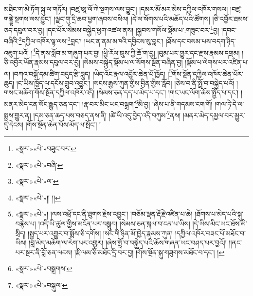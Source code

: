 མཐིང་ག་མེ་ཏོག་སྐུ་ལ་གཏོར། །བཛྲ་ཨཱ་ལོ་ཀེ་སྔགས་ལས་བྱུང་། །དམར་མོ་མར་མེས་དཀྱིལ་འཁོར་གསལ། །བཛྲ་གནྡྷེ་སྔགས་ལས་བྱུང་། །ལྗང་གུ་དྲི་ཆབ་ཕྱག་ཞབས་བསིལ། །དེ་ལ་སོགས་པའི་མཆོད་པའི་ཚོགས། །ཅི་འབྱོར་ཐམས་ཅད་དབུལ་བར་བྱ། །དང་པོར་སེམས་བསྐྱེད་ཕྱག་འཚལ་ནས། །སྐྱབས་གསོལ་སྡོམ་པ་:གཟུང་བར་\footnote{«སྣར་»«པེ་»བཟུང་བར་}བྱ། །དབང་བཞིའི་\footnote{«སྣར་»«པེ་»བཞི་}དཀྱིལ་འཁོར་ལྷ་ལས་\footnote{«སྣར་»«པེ་»ལ་}བླང་། །ཡང་ན་ནམ་མཁའི་དབྱིངས་སུ་བླང་། །ཐོས་དང་བསམ་པས་བདག་ཉིད་འཇུག་པའོ། །\footnote{«སྣར་»«པེ་»།། །།}དེ་ནས་སློབ་མ་གཞུག་པར་བྱ། །ཕྱི་རོལ་ཁྲུས་ཀྱི་ཆོ་ག་བྱ། །བུམ་པར་གྱུར་དང་རྫས་རྣམས་དགྲམ། །ཅི་འབྱོར་ཡོན་རྣམས་དབུལ་བར་བྱ། །སེམས་བསྐྱེད་སྡོམ་པ་ལ་སོགས་སྔོན་བཞིན་བྱ། །སྡོམ་པ་ལེགས་པར་འཛིན་པ་ལ། །བཀའ་བསྒོ་དམ་ཚིག་བདུད་རྩི་བླུད། །ཡིད་འོང་རྣལ་འབྱོར་ཆེན་པོ་ཁྱོད། །\footnote{«སྣར་»«པེ་»། །ལས་འཕྲོ་དང་ནི་ཐུགས་རྗེས་འབྱུང་། །བཅོམ་ལྡན་རྡོ་རྗེ་འཛིན་པ་ཆེ། །ཐོགས་པ་མེད་པའི་སྐུ་བརྙེས་པ། །འདི་ཡི་ཚུལ་གྱིས་མངོན་པར་བསྒྲུབ། །སེམས་ཅན་སྐལ་བ་ངན་པ་ཡིས། །དེ་ཡིས་མིང་ཡང་ཐོས་མི་སྲིད། །སྤྱད་པར་འགྱུར་བ་སྨོས་ཅི་དགོས། །སང་གི་ཉིན་མོ་ཁྱེད་རྣམས་ཀུན། །དཀྱིལ་འཁོར་བཟང་པོ་མཐོང་བ་ཡིས། །བླ་མེད་མཆོག་ལ་རེག་པར་འགྱུར། །ཞེས་སྤྲོ་བ་བསྐྱེད་པའི་ཆོས་གཞན་ཡང་བཤད་པར་བྱའོ།། །།ནང་པར་སྔར་ནི་བློ་ཅན་ལངས། །རྨི་ལམ་ཅི་མཐོང་དྲི་བར་བྱ། །གོས་སྔོན་སྐུ་གཟུགས་མཐོང་བ་དང་། །}གོས་སྔོན་དཀྱིལ་འཁོར་ཆེན་པོར་ཆུད། །ང་ཡིས་ཁྱོད་ལ་དངོས་གྲུབ་འབྱུང་། །སངས་རྒྱས་ཀུན་གྱིས་བྱིན་གྱིས་རློབ། །ཅེས་བ་ནི་སྤྲོ་བ་བསྐྱེད་པའོ། །གསང་མཆོག་གོས་སྔོན་དཀྱིལ་འཁོར་འདི། །སེམས་ཅན་དད་པ་མེད་པ་དང་། །གང་ཡང་ལོག་ཆོས་སྤྱོད་པ་དང་། །མནར་མེད་ངན་སོང་རྒྱུད་ཅན་དང་། །རྣ་བར་མིང་ཡང་བསྒྲག་\footnote{«སྣར་»«པེ་»བསྒྲགས་}མི་བྱ། །ཞེས་པ་ནི་གདམས་ངག་གོ། །གལ་ཏེ་དེ་ལ་སྨྲས་གྱུར་ན། །དམ་ཅན་ཆད་པས་བཅད་ནས་ནི། །ཚེ་ཡི་འདུ་བྱེད་འདི་བཀུམ་\footnote{«སྣར་»«པེ་»བསྐུལ་}ནས། །མནར་མེད་དམྱལ་བར་མྱུར་དུ་དེངས། །གོས་སྔོན་ཆེན་པོས་མོད་ལ་སྤོང་། །
